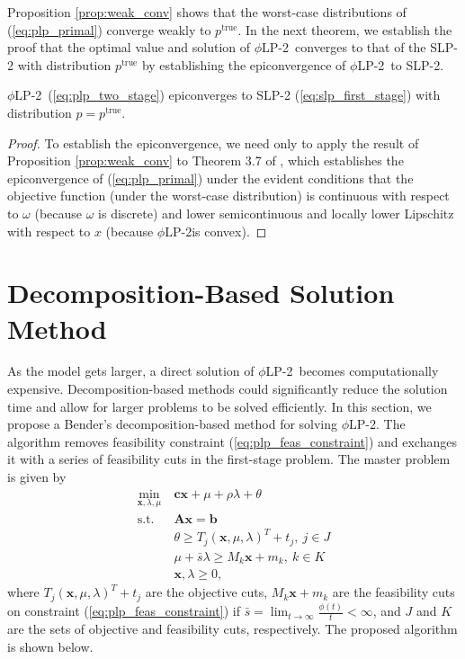 \documentclass[ijoc,letterpaper]{informs3} %
\newcommand{\x}{\mathbf{x}}
\renewcommand{\c}{\mathbf{c}}
\newcommand{\A}{\mathbf{A}}
\renewcommand{\b}{\mathbf{b}}
\newcommand{\ptrue}{p^{\text{true}}}
\newcommand{\st}{\mbox{s.t.}}
\newcommand{\plp}{$\phi$LP-2}
\begin{document}
Proposition \ref{prop:weak_conv} shows that the worst-case distributions of (\ref{eq:plp_primal}) converge weakly to $\ptrue$.
In the next theorem, we establish the proof that the optimal value and solution of \plp\ converges to that of the SLP-2 with distribution $\ptrue$ by establishing the epiconvergence of \plp\ to SLP-2.
\begin{theorem}
	\plp\ (\ref{eq:plp_two_stage}) epiconverges to SLP-2 (\ref{eq:slp_first_stage}) with distribution $p = \ptrue$.
\end{theorem}

\begin{proof}
	To establish the epiconvergence, we need only to apply the result of Proposition \ref{prop:weak_conv} to Theorem 3.7 of \cite{dupacova1988asymptotic}, which establishes the epiconvergence of (\ref{eq:plp_primal}) under the evident conditions that the objective function (under the worst-case distribution) is continuous with respect to $\omega$ (because $\omega$ is discrete) and lower semicontinuous and locally lower Lipschitz with respect to $x$ (because \plp is convex).
\end{proof}

\section{Decomposition-Based Solution Method}
\label{sec:soln_algorithm}

As the model gets larger, a direct solution of \plp\ becomes computationally expensive. 
Decomposition-based methods could significantly reduce the solution time and allow for larger problems to be solved efficiently. In this section, we propose a Bender's decomposition-based method for solving \plp.
The algorithm removes feasibility constraint (\ref{eq:plp_feas_constraint})  and exchanges it with a series of feasibility cuts in the first-stage problem.
The master problem is given by
\begin{align}
	\min_{\x,\lambda,\mu} \ & \c\x + \mu + \rho \lambda + \theta \label{eq:master_problem}\\
	\st \ & \A\x = \b \nonumber \\
	& \theta \geq T_j (\x,\mu,\lambda)^T + t_j, \ j \in J \nonumber \\
	& \mu + \bar{s}\lambda \geq M_k \x + m_k, \ k \in K \nonumber \\
	& \x,\lambda \geq 0, \nonumber
\end{align}
where $T_j (\x,\mu,\lambda)^T + t_j$ are the objective cuts, $M_k \x + m_k$ are the feasibility cuts on constraint (\ref{eq:plp_feas_constraint}) if $\bar{s} = \lim_{t \rightarrow \infty} \frac{\phi(t)}{t} < \infty$, and $J$ and $K$ are the sets of objective and feasibility cuts, respectively.
The proposed algorithm is shown below.
\end{document}
